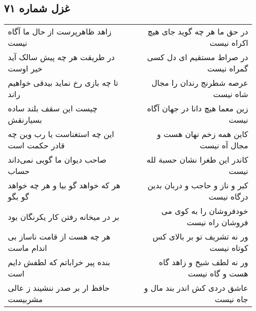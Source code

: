 \begin{center}
\section*{غزل شماره ۷۱}
\label{sec:sh071}
\begin{longtable}{l p{0.5cm} r}
زاهد ظاهرپرست از حال ما آگاه نیست
&&
در حق ما هر چه گوید جای هیچ اکراه نیست
\\
در طریقت هر چه پیش سالک آید خیر اوست
&&
در صراط مستقیم ای دل کسی گمراه نیست
\\
تا چه بازی رخ نماید بیدقی خواهیم راند
&&
عرصه شطرنج رندان را مجال شاه نیست
\\
چیست این سقف بلند ساده بسیارنقش
&&
زین معما هیچ دانا در جهان آگاه نیست
\\
این چه استغناست یا رب وین چه قادر حکمت است
&&
کاین همه زخم نهان هست و مجال آه نیست
\\
صاحب دیوان ما گویی نمی‌داند حساب
&&
کاندر این طغرا نشان حسبة لله نیست
\\
هر که خواهد گو بیا و هر چه خواهد گو بگو
&&
کبر و ناز و حاجب و دربان بدین درگاه نیست
\\
بر در میخانه رفتن کار یکرنگان بود
&&
خودفروشان را به کوی می فروشان راه نیست
\\
هر چه هست از قامت ناساز بی اندام ماست
&&
ور نه تشریف تو بر بالای کس کوتاه نیست
\\
بنده پیر خراباتم که لطفش دایم است
&&
ور نه لطف شیخ و زاهد گاه هست و گاه نیست
\\
حافظ ار بر صدر ننشیند ز عالی مشربیست
&&
عاشق دردی کش اندر بند مال و جاه نیست
\\
\end{longtable}
\end{center}
